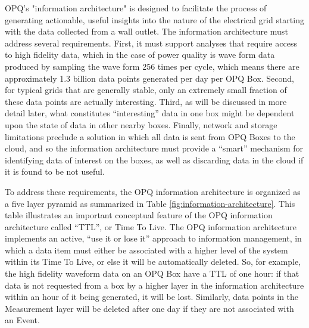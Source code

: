 OPQ's "information architecture" is designed to facilitate the process of generating actionable, useful insights into the nature of the electrical grid starting with the data collected from a wall outlet. The information architecture must address several requirements. First, it must support analyses that require access to high fidelity data, which in the case of power quality is wave form data produced by sampling the wave form 256 times per cycle, which means there are approximately 1.3 billion data points generated per day per OPQ Box. Second, for typical grids that are generally stable, only an extremely small fraction of these data points are actually interesting. Third, as will be discussed in more detail later, what constitutes ``interesting'' data in one box might be dependent upon the state of data in other nearby boxes. Finally, network and storage limitations preclude a solution in which all data is sent from OPQ Boxes to the cloud, and so the information architecture must provide a ``smart'' mechanism for identifying data of interest on the boxes, as well as discarding data in the cloud if it is found to be not useful.

To address these requirements, the OPQ information architecture is organized as a five layer pyramid as summarized in Table \ref{fig:information-architecture}. This table illustrates an important conceptual feature of the OPQ information architecture called ``TTL'', or Time To Live. The OPQ information architecture implements an active, ``use it or lose it'' approach to information management, in which a data item must either be associated with a higher level of the system within its Time To Live, or else it will be automatically deleted. So, for example, the high fidelity waveform data on an OPQ Box have a TTL of one hour: if that data is not requested from a box by a higher layer in the information architecture within an hour of it being generated, it will be lost. Similarly, data points in the Measurement layer will be deleted after one day if they are not associated with an Event.

